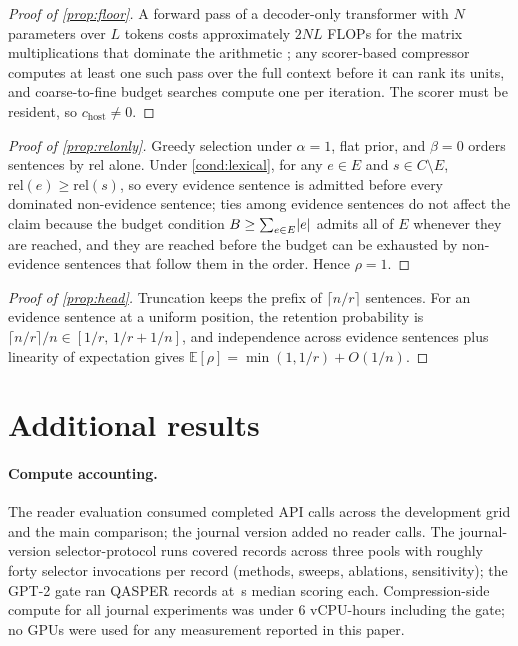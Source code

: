 \documentclass[preprint,12pt]{elsarticle}
\DeclarePairedDelimiter\abs{\lvert}{\rvert}
\theoremstyle{remark}
\begin{document}
\begin{proof}[Proof of \autoref{prop:floor}]
A forward pass of a decoder-only transformer with $N$ parameters over
$L$ tokens costs approximately $2NL$ FLOPs for the matrix
multiplications that dominate the arithmetic
\citep{kaplan2020scaling}; any scorer-based compressor computes at
least one such pass over the full context before it can rank its
units, and coarse-to-fine budget searches compute one per iteration.
The scorer must be resident, so $c_{\mathrm{host}} \ne 0$.
\end{proof}

\begin{proof}[Proof of \autoref{prop:relonly}]
Greedy selection under $\alpha = 1$, flat prior, and $\beta = 0$
orders sentences by $\mathrm{rel}$ alone. Under
\autoref{cond:lexical}, for any $e \in E$ and
$s \in C \setminus E$, $\mathrm{rel}(e) \ge \mathrm{rel}(s)$, so every
evidence sentence is admitted before every dominated non-evidence
sentence; ties among evidence sentences do not affect the claim
because the budget condition
$B \ge \sum_{e \in E} \abs{e}$ admits all of $E$ whenever they are
reached, and they are reached before the budget can be exhausted by
non-evidence sentences that follow them in the order. Hence $\rho=1$.
\end{proof}

\begin{proof}[Proof of \autoref{prop:head}]
Truncation keeps the prefix of $\lceil n/r \rceil$ sentences. For an
evidence sentence at a uniform position, the retention probability is
$\lceil n/r \rceil / n \in [1/r,\, 1/r + 1/n]$, and independence
across evidence sentences plus linearity of expectation gives
$\mathbb{E}[\rho] = \min(1, 1/r) + O(1/n)$.
\end{proof}

\section{Additional results}
\label{app:results}

\paragraph{Compute accounting.}
The reader evaluation consumed \TotalCalls{} completed API calls
across the development grid and the main comparison; the journal
version added no reader calls. The journal-version selector-protocol
runs covered \TotalRecords{} records across three pools with roughly
forty selector invocations per record (methods, sweeps, ablations,
sensitivity); the GPT-2 gate ran \GateN{} QASPER records at
\GateLatMedS\,s median scoring each. Compression-side compute for all
journal experiments was under 6 vCPU-hours including the gate; no
GPUs were used for any measurement reported in this paper.
\end{document}
